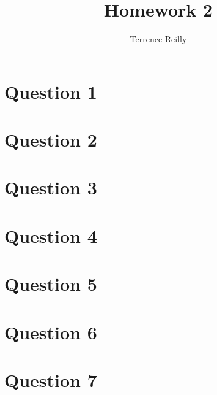 \documentclass[a4paper,12pt]{article}
\author{Terrence Reilly}
\title{Homework 2}
\begin{document}
    \maketitle

    \section*{Question 1}
        

    \section*{Question 2}
        

    \section*{Question 3}
        

    \section*{Question 4}
        

    \section*{Question 5}
        

    \section*{Question 6}
        

    \section*{Question 7}
        
\end{document}
